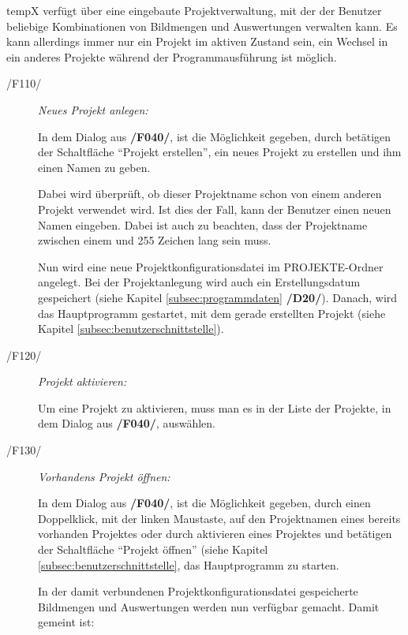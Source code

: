 \label{subsec:projektmanagement}
	
	\gls{tempX} verfügt über eine eingebaute Projektverwaltung, mit der der Benutzer beliebige Kombinationen von Bildmengen und Auswertungen verwalten kann. Es kann allerdings immer nur ein Projekt im aktiven Zustand sein, ein Wechsel in ein anderes Projekte während der Programmausführung ist möglich.
	
	\begin{description}		
		
		\item[/F110/] \textit{Neues Projekt anlegen:}\par In dem Dialog aus \textbf{/F040/}, ist die Möglichkeit gegeben, durch betätigen der Schaltfläche "`Projekt erstellen"', ein neues Projekt zu erstellen und ihm einen Namen zu geben.\par Dabei wird überprüft, ob dieser Projektname schon von einem anderen Projekt verwendet wird. Ist dies der Fall, kann der Benutzer einen neuen Namen eingeben. Dabei ist auch zu beachten, dass der Projektname zwischen einem und 255 Zeichen lang sein muss.\par Nun wird eine neue Projektkonfigurationsdatei im PROJEKTE-Ordner angelegt. Bei der Projektanlegung wird auch ein Erstellungsdatum gespeichert (siehe Kapitel \ref{subsec:programmdaten} \textbf{/D20/}). Danach, wird das Hauptprogramm gestartet, mit dem gerade erstellten Projekt (siehe Kapitel \ref{subsec:benutzerschnittstelle}).
		
		\item[/F120/] \textit{Projekt aktivieren:}\par Um eine Projekt zu aktivieren, muss man es in der Liste der Projekte, in dem Dialog aus \textbf{/F040/}, auswählen.
		
		\item[/F130/] \textit{Vorhandens Projekt öffnen:}\par In dem Dialog aus \textbf{/F040/}, ist die Möglichkeit gegeben, durch einen Doppelklick, mit der linken Maustaste, auf den Projektnamen eines bereits vorhanden Projektes oder durch aktivieren eines Projektes und betätigen der Schaltfläche "`Projekt öffnen"' (siehe Kapitel \ref{subsec:benutzerschnittstelle}, das Hauptprogramm zu starten.\par In der damit verbundenen Projektkonfigurationsdatei gespeicherte Bildmengen und Auswertungen werden nun verfügbar gemacht. Damit gemeint ist: 
			
			\begin{itemize}
				

\end{itemize}
\end{description}
